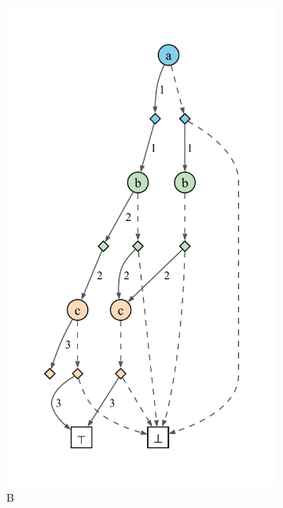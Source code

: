 \documentclass[acmsmall,dvipsnames,nonacm]{acmart}
\begin{document}
\begin{figure}
\begin{subfigure}[b]{0.25\textwidth}
        \includegraphics[scale=0.45]{deriv/derivsppB.pdf}
        \caption*{B}
    \end{subfigure}
    \begin{subfigure}[b]{0.16\textwidth}

\end{subfigure}
\end{figure}
\end{document}
